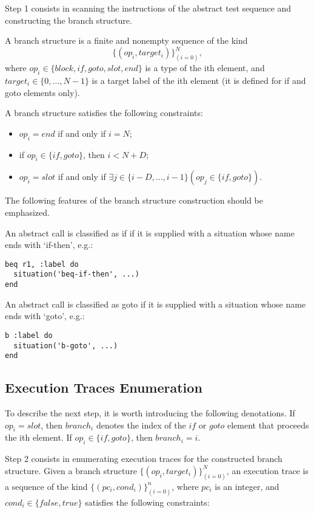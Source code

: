 Step 1 consists in scanning the instructions of the abstract test sequence and constructing the branch structure.

A branch structure is a finite and nonempty sequence of the kind
$$\{(op_i,target_i)\}_(i=0)^N,$$
where $op_i \in \{block, if, goto, slot, end\}$ is a type of the ith element,
and $target_i \in \{0, ... ,N-1\}$ is a target label of the ith element (it is defined for if and goto elements only).

A branch structure satisfies the following constraints:

\begin{itemize}
\item
$op_i = end$ if and only if $i = N$;
\item
if $op_i \in \{if, goto\}$, then $i < N + D$;
\item
$op_i = slot$ if and only if $\exists j \in \{i-D, ..., i-1\} (op_j \in \{if, goto\})$.
\end{itemize}

The following features of the branch structure construction should be emphasized.

An abstract call is classified as if if it is supplied with a situation whose name ends with `if-then', e.g.:

\begin{lstlisting}
beq r1, :label do
  situation('beq-if-then', ...)
end
\end{lstlisting}

An abstract call is classified as goto if it is supplied with a situation whose name ends with `goto', e.g.:

\begin{lstlisting}
b :label do
  situation('b-goto', ...)
end
\end{lstlisting}

\subsection{Execution Traces Enumeration}

To describe the next step, it is worth introducing the following denotations.
If $op_i = slot$, then $branch_i$ denotes the index of the $if$ or $goto$ element that proceeds the ith element.
If $op_i \in \{if, goto\}$, then $branch_i = i$.

Step 2 consists in enumerating execution traces for the constructed branch structure.
Given a branch structure $\{(op_i, target_i)\}_(i=0)^N$, an execution trace is a sequence of the kind $\{(pc_i,cond_i)\}_(i=0)^n$,
where $pc_i$ is an integer, and $cond_i \in \{false, true\}$ satisfies the following constraints:

